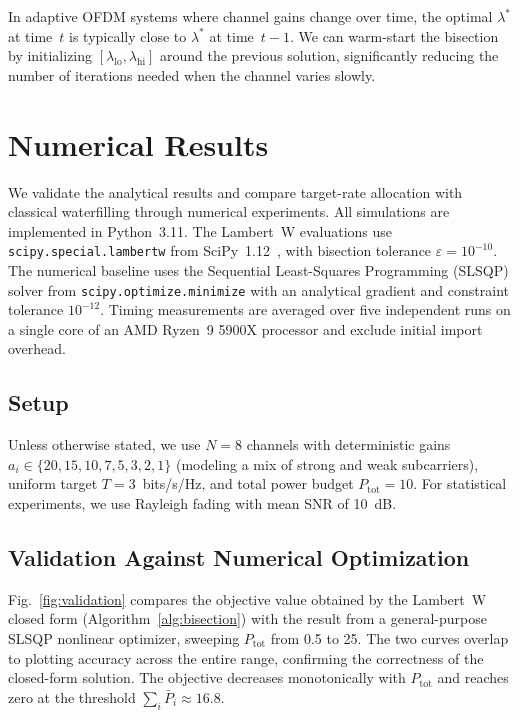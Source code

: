 \documentclass[journal]{IEEEtran}
\begin{document}
In adaptive OFDM systems where channel gains change over time, the optimal $\lambda^*$ at time~$t$ is typically close to $\lambda^*$ at time~$t-1$.
We can warm-start the bisection by initializing $[\lambda_{\mathrm{lo}}, \lambda_{\mathrm{hi}}]$ around the previous solution, significantly reducing the number of iterations needed when the channel varies slowly.

\section{Numerical Results}
\label{sec:results}

We validate the analytical results and compare target-rate allocation with classical waterfilling through numerical experiments.
All simulations are implemented in Python~3.11.
The Lambert~W evaluations use \texttt{scipy.special.lambertw} from SciPy~1.12~\cite{scipy_lambertw}, with bisection tolerance $\varepsilon = 10^{-10}$.
The numerical baseline uses the Sequential Least-Squares Programming (SLSQP) solver from \texttt{scipy.optimize.minimize} with an analytical gradient and constraint tolerance $10^{-12}$.
Timing measurements are averaged over five independent runs on a single core of an AMD Ryzen~9 5900X processor and exclude initial import overhead.

\subsection{Setup}

Unless otherwise stated, we use $N = 8$ channels with deterministic gains $a_i \in \{20, 15, 10, 7, 5, 3, 2, 1\}$ (modeling a mix of strong and weak subcarriers), uniform target $T = 3$~bits/s/Hz, and total power budget $P_{\mathrm{tot}} = 10$.
For statistical experiments, we use Rayleigh fading with mean SNR of 10~dB.

\subsection{Validation Against Numerical Optimization}

Fig.~\ref{fig:validation} compares the objective value obtained by the Lambert~W closed form (Algorithm~\ref{alg:bisection}) with the result from a general-purpose SLSQP nonlinear optimizer, sweeping $P_{\mathrm{tot}}$ from 0.5 to 25.
The two curves overlap to plotting accuracy across the entire range, confirming the correctness of the closed-form solution.
The objective decreases monotonically with $P_{\mathrm{tot}}$ and reaches zero at the threshold $\sum_i \bar{P}_i \approx 16.8$.
\end{document}
